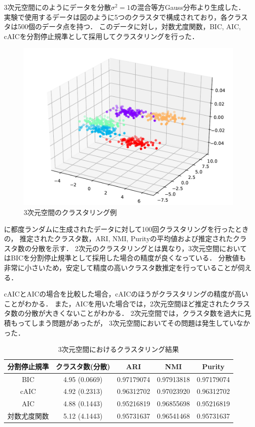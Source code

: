 3次元空間にのようにデータを分散$\sigma^2=1$の混合等方Gauss分布より生成した．
実験で使用するデータは図のように5つのクラスタで構成されており，各クラスタは500個のデータ点を持つ．
このデータに対し，対数尤度関数，BIC, AIC, cAICを分割停止規準として採用してクラスタリングを行った．

\begin{figure}[htbp]
  \begin{center}
    \includegraphics[width=0.7\linewidth]{./img/BIC_3.pdf}
      \caption{3次元空間のクラスタリング例}
      \label{fig:3dim}
  \end{center}
\end{figure}

に都度ランダムに生成されたデータに対して100回クラスタリングを行ったときの，
推定されたクラスタ数，ARI, NMI, Purityの平均値および推定されたクラスタ数の分散を示す．
2次元のクラスタリングとは異なり，3次元空間においてはBICを分割停止規準として採用した場合の精度が良くなっている．
分散値も非常に小さいため，安定して精度の高いクラスタ数推定を行っていることが伺える．

cAICとAICの場合を比較した場合，cAICのほうがクラスタリングの精度が高いことがわかる．
また，AICを用いた場合では，2次元空間ほど推定されたクラスタ数の分散が大きくないことがわかる．
2次元空間では，クラスタ数を過大に見積もってしまう問題があったが，
3次元空間においてその問題は発生していなかった．

\begin{table}[htb]
  \centering
  \caption{3次元空間におけるクラスタリング結果}
  \label{table:3dim}
  \begin{tabular}{|c|c|c|c|c|} \hline
    分割停止規準 & クラスタ数(分散) & ARI & NMI & Purity \\\hline
    BIC & 4.95 (0.0669) & 0.97179074 & 0.97913818 & 0.97179074\\
    cAIC & 4.92 (0.2313) & 0.96312702 & 0.97023920 & 0.96312702\\
    AIC & 4.88 (0.1443) & 0.95216819 & 0.96855698 & 0.95216819\\
    対数尤度関数 & 5.12 (4.1443) & 0.95731637 & 0.96541468 & 0.95731637\\\hline
  \end{tabular}
\end{table}
